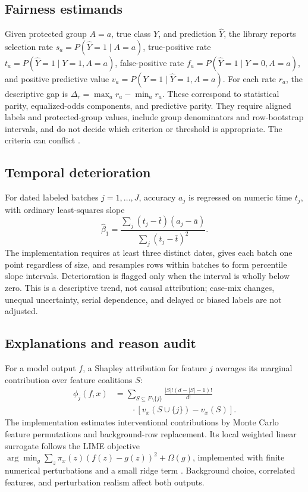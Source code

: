 \documentclass[conference]{IEEEtran}
\begin{document}
\subsection{Fairness estimands}
Given protected group \(A=a\), true class \(Y\), and prediction \(\hat Y\), the library reports selection rate \(s_a=P(\hat Y=1\mid A=a)\), true-positive rate \(t_a=P(\hat Y=1\mid Y=1,A=a)\), false-positive rate \(f_a=P(\hat Y=1\mid Y=0,A=a)\), and positive predictive value \(v_a=P(Y=1\mid\hat Y=1,A=a)\). For each rate \(r_a\), the descriptive gap is \(\Delta_r=\max_a r_a-\min_a r_a\). These correspond to statistical parity, equalized-odds components, and predictive parity. They require aligned labels and protected-group values, include group denominators and row-bootstrap intervals, and do not decide which criterion or threshold is appropriate. The criteria can conflict \cite{chouldechova2017}.

\subsection{Temporal deterioration}
For dated labeled batches \(j=1,\ldots,J\), accuracy \(a_j\) is regressed on numeric time \(t_j\), with ordinary least-squares slope
\[
\hat\beta_1=\frac{\sum_j(t_j-\bar t)(a_j-\bar a)}
{\sum_j(t_j-\bar t)^2}.
\]
The implementation requires at least three distinct dates, gives each batch one point regardless of size, and resamples rows within batches to form percentile slope intervals. Deterioration is flagged only when the interval is wholly below zero. This is a descriptive trend, not causal attribution; case-mix changes, unequal uncertainty, serial dependence, and delayed or biased labels are not adjusted.

\subsection{Explanations and reason audit}
For a model output \(f\), a Shapley attribution for feature \(j\) averages its marginal contribution over feature coalitions \(S\):
\[
\begin{aligned}
\phi_j(f,x)
&=\sum_{S\subseteq F\setminus\{j\}}
\frac{|S|!(d-|S|-1)!}{d!}\\
&\qquad\cdot\left[v_x(S\cup\{j\})-v_x(S)\right].
\end{aligned}
\]
The implementation estimates interventional contributions by Monte Carlo feature permutations and background-row replacement. Its local weighted linear surrogate follows the LIME objective \(\arg\min_g\sum_z\pi_x(z)(f(z)-g(z))^2+\Omega(g)\), implemented with finite numerical perturbations and a small ridge term \cite{lundberg2017,ribeiro2016}. Background choice, correlated features, and perturbation realism affect both outputs.
\end{document}
